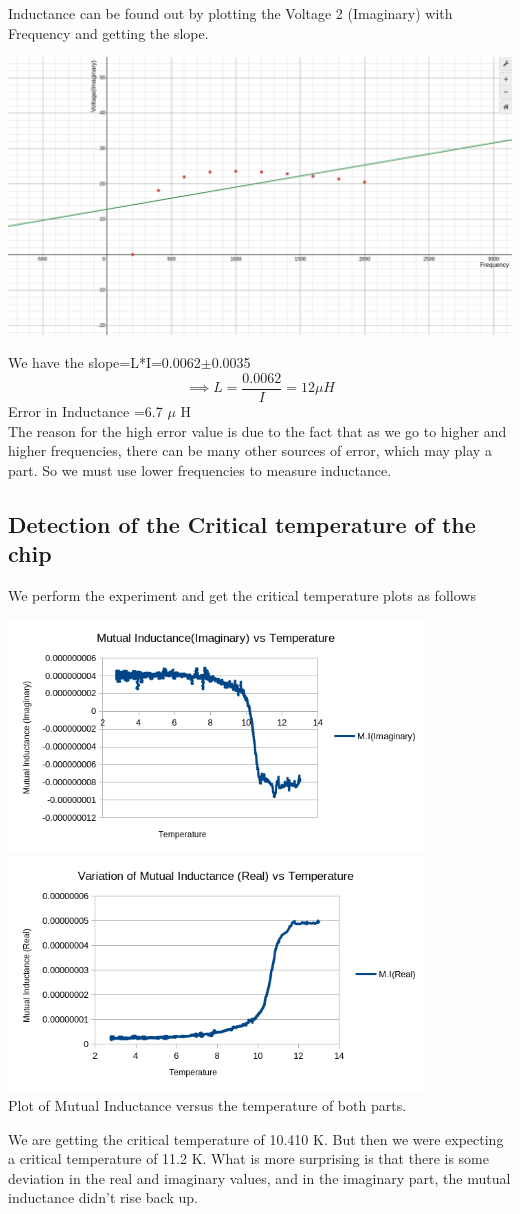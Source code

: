 \documentclass[]{report}[12 pt]
\begin{document}
Inductance can be found out by plotting the Voltage 2 (Imaginary) with Frequency and getting the slope.
\begin{center}
	\includegraphics[width=10 cm]{ind.png}
\end{center}
We have the slope=L*I=0.0062$\pm$0.0035
\[\implies L = \frac{0.0062}{I}=12 \mu H\]
Error in Inductance =6.7 $\mu$ H\\
The reason for the high error value is due to the fact that as we go to higher and higher frequencies, there can be many other sources of error, which may play a part. So we must use lower frequencies to measure inductance.
\subsection*{Detection of the Critical temperature of the chip}
We perform the experiment and get the critical temperature plots as follows
\begin{center}
	\includegraphics[width=11cm]{plot1.png}
	\includegraphics[width=11cm]{plot2.png}\\
	Plot of Mutual Inductance versus the temperature of both parts.
\end{center}
	We are getting the critical temperature of 10.410 K. But then we were expecting a critical temperature of 11.2 K. What is more surprising is that there is some deviation in the real and imaginary values, and in the imaginary part, the mutual inductance didn't rise back up.
\end{document}
